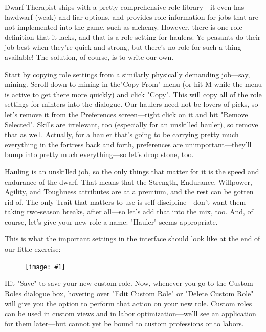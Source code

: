 \documentclass[]{article}
\newcommand{\legacy}[1] {
\begin{center}
\colorbox{legacy-content}{
\begin{minipage}[t]{0.95\linewidth}
#1
\end{minipage}
}
\end{center}
}
\newcommand{\fullfigure}[1] {
\begin{figure}[h!]
\texttt{[image: \#1]}
\end{figure}
}
\begin{document}
Dwarf Therapist ships with a pretty comprehensive role library---it even has lawdwarf (weak) and liar
options, and provides role information for jobs that are not implemented into the game, such as alchemy.
However, there is one role definition that it lacks, and that is a role setting for haulers. Ye peasants
do their job best when they're quick and strong, but there's no role for such a thing available! The
solution, of course, is to write our own.

Start by copying role settings from a similarly physically demanding job---say, mining. Scroll down to
mining in the"Copy From" menu (or hit M while the menu is active to get there more quickly) and click
"Copy". This will copy all of the role settings for minters into the dialogue. Our haulers need not be
lovers of picks, so let's remove it from the Preferences screen---right click on it and hit "Remove
Selected". Skills are irrelevant, too (especially for an unskilled hauler), so remove that as well.
Actually, for a hauler that's going to be carrying pretty much everything in the fortress back and forth,
preferences are unimportant---they'll bump into pretty much everything---so let's drop stone, too.

Hauling is an unskilled job, so the only things that matter for it is the speed and endurance of the
dwarf. That means that the Strength, Endurance, Willpower, Agility, and Toughness attributes are at a
premium, and the rest can be gotten rid of. The only Trait that matters to use is self-discipline---don't
want them taking two-season breaks, after all---so let's add that into the mix, too. And, of course,
let's give your new role a name: "Hauler" seems appropriate.

This is what the important settings in the interface should look like at the end of our little exercise:

\fullfigure{Sec3Fig9}

Hit "Save" to save your new custom role. Now, whenever you go to the Custom Roles dialogue box, hovering
over "Edit Custom Role" or "Delete Custom Role" will give you the option to perform that action on your
new role. Custom roles can be used in custom views and in labor optimization---we'll see an application
for them later---but cannot yet be bound to custom professions or to labors.
\end{document}
